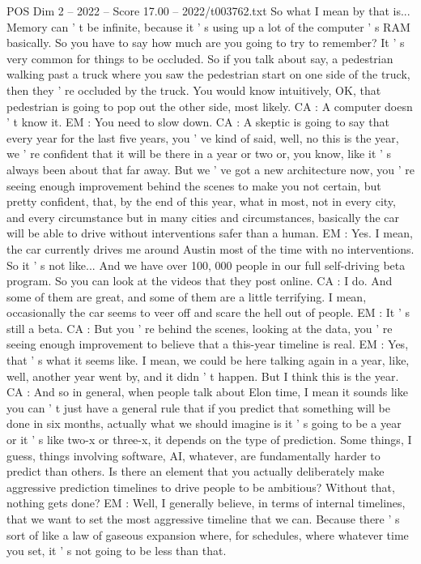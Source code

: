 \begin{textsample}{POS Dim 2 – 2022 – Score 17.00 – 2022/t003762.txt}
So what I mean by that is...
Memory can ' t be infinite, because it ' s using up a lot of the computer ' s RAM basically.
So you have to say how much are you going to try to remember?
It ' s very common for things to be occluded.
So if you talk about say, a pedestrian walking past a truck where you saw the pedestrian start on one side of the truck, then they ' re occluded by the truck.
You would know intuitively, OK, that pedestrian is going to pop out the other side, most likely.
CA : A computer doesn ' t know it.
EM : You need to slow down.
CA : A skeptic is going to say that every year for the last five years, you ' ve kind of said, well, no this is the year, we ' re confident that it will be there in a year or two or, you know, like it ' s always been about that far away.
But we ' ve got a new architecture now, you ' re seeing enough improvement behind the scenes to make you not certain, but pretty confident, that, by the end of this year, what in most, not in every city, and every circumstance but in many cities and circumstances, basically the car will be able to drive without interventions safer than a human.
EM : Yes.
I mean, the car currently drives me around Austin most of the time with no interventions.
So it ' s not like...
And we have over 100, 000 people in our full self-driving beta program.
So you can look at the videos that they post online.
CA : I do.
And some of them are great, and some of them are a little terrifying.
I mean, occasionally the car seems to veer off and scare the hell out of people.
EM : It ' s still a beta.
CA : But you ' re behind the scenes, looking at the data, you ' re seeing enough improvement to believe that a this-year timeline is real.
EM : Yes, that ' s what it seems like.
I mean, we could be here talking again in a year, like, well, another year went by, and it didn ' t happen.
But I think this is the year.
CA : And so in general, when people talk about Elon time, I mean it sounds like you can ' t just have a general rule that if you predict that something will be done in six months, actually what we should imagine is it ' s going to be a year or it ' s like two-x or three-x, it depends on the type of prediction.
Some things, I guess, things involving software, AI, whatever, are fundamentally harder to predict than others.
Is there an element that you actually deliberately make aggressive prediction timelines to drive people to be ambitious?
Without that, nothing gets done?
EM : Well, I generally believe, in terms of internal timelines, that we want to set the most aggressive timeline that we can.
Because there ' s sort of like a law of gaseous expansion where, for schedules, where whatever time you set, it ' s not going to be less than that.

\end{textsample}
